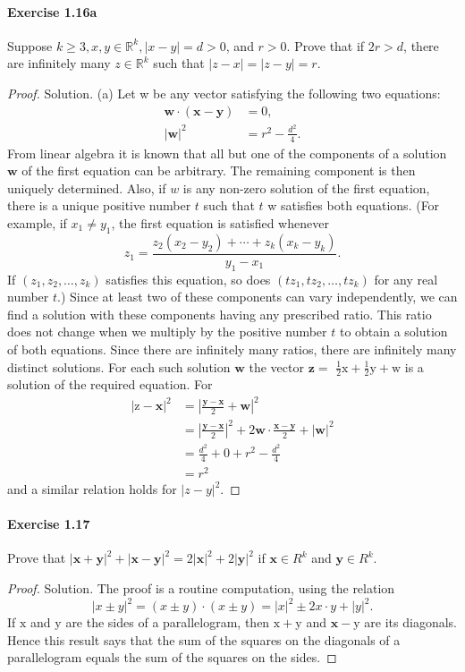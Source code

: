 \documentclass{article}
\theoremstyle{definition}
\begin{document}
\paragraph{Exercise 1.16a} Suppose $k \geq 3, x, y \in \mathbb{R}^k, |x - y| = d > 0$, and $r > 0$. Prove that if $2r > d$, there are infinitely many $z \in \mathbb{R}^k$ such that $|z-x|=|z-y|=r$.
\begin{proof}
    Solution. (a) Let w be any vector satisfying the following two equations:
$$
\begin{aligned}
\mathbf{w} \cdot(\mathbf{x}-\mathbf{y}) &=0, \\
|\mathbf{w}|^2 &=r^2-\frac{d^2}{4} .
\end{aligned}
$$
From linear algebra it is known that all but one of the components of a solution $\mathbf{w}$ of the first equation can be arbitrary. The remaining component is then uniquely determined. Also, if $w$ is any non-zero solution of the first equation, there is a unique positive number $t$ such that $t$ w satisfies both equations. (For example, if $x_1 \neq y_1$, the first equation is satisfied whenever
$$
z_1=\frac{z_2\left(x_2-y_2\right)+\cdots+z_k\left(x_k-y_k\right)}{y_1-x_1} .
$$
If $\left(z_1, z_2, \ldots, z_k\right)$ satisfies this equation, so does $\left(t z_1, t z_2, \ldots, t z_k\right)$ for any real number $t$.) Since at least two of these components can vary independently, we can find a solution with these components having any prescribed ratio. This ratio does not change when we multiply by the positive number $t$ to obtain a solution of both equations. Since there are infinitely many ratios, there are infinitely many distinct solutions. For each such solution $\mathbf{w}$ the vector $\mathbf{z}=$ $\frac{1}{2} \mathrm{x}+\frac{1}{2} \mathrm{y}+\mathrm{w}$ is a solution of the required equation. For
$$
\begin{aligned}
|\mathrm{z}-\mathbf{x}|^2 &=\left|\frac{\mathbf{y}-\mathbf{x}}{2}+\mathbf{w}\right|^2 \\
&=\left|\frac{\mathbf{y}-\mathbf{x}}{2}\right|^2+2 \mathbf{w} \cdot \frac{\mathbf{x}-\mathbf{y}}{2}+|\mathbf{w}|^2 \\
&=\frac{d^2}{4}+0+r^2-\frac{d^2}{4} \\
&=r^2
\end{aligned}
$$
and a similar relation holds for $|z-y|^2$.
\end{proof}


\paragraph{Exercise 1.17} Prove that $|\mathbf{x}+\mathbf{y}|^{2}+|\mathbf{x}-\mathbf{y}|^{2}=2|\mathbf{x}|^{2}+2|\mathbf{y}|^{2}$ if $\mathbf{x} \in R^{k}$ and $\mathbf{y} \in R^{k}$.
\begin{proof}
    Solution. The proof is a routine computation, using the relation
$$
|x \pm y|^2=(x \pm y) \cdot(x \pm y)=|x|^2 \pm 2 x \cdot y+|y|^2 .
$$
If $\mathrm{x}$ and $\mathrm{y}$ are the sides of a parallelogram, then $\mathrm{x}+\mathrm{y}$ and $\mathbf{x}-\mathrm{y}$ are its diagonals. Hence this result says that the sum of the squares on the diagonals of a parallelogram equals the sum of the squares on the sides.
\end{proof}
\end{document}

